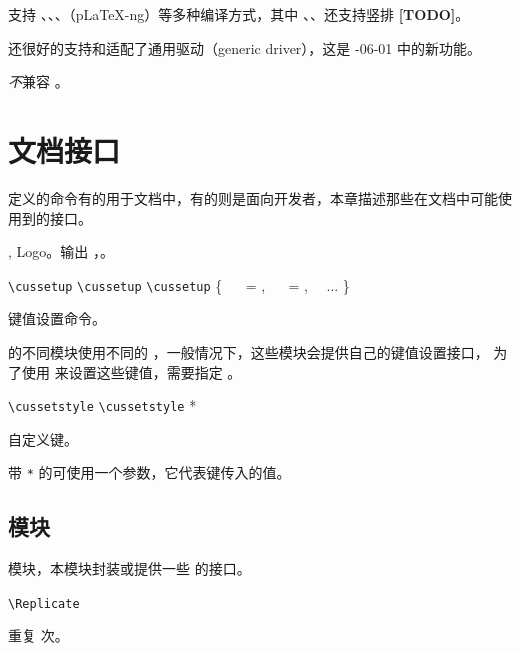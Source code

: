 \documentclass[twoside]{book}
\newcommand*{\TODO}{\textcolor{red!90!black}{\bfseries[TODO]}}
\begin{document}
\CusTeX 支持 \XeLaTeX、\LuaLaTeX、\upLaTeX、\ApLaTeX（p\LaTeX-ng）等多种编译方式，其中
\LuaLaTeX、\upLaTeX、\ApLaTeX 还支持竖排 \TODO。

\CusTeX 还很好的支持和适配了通用驱动（generic driver），这是 -06-01 中的新功能。

\emph{不}兼容 。

\chapter{文档接口}

\CusTeX 定义的命令有的用于文档中，有的则是面向开发者，本章描述那些在文档中可能使用到的接口。

\begin{function}{\CusTeX,\CusLaTeX}
Logo。输出 \CusTeX，\CusLaTeX。
\end{function}

\begin{function}{\cussetup}
\begin{syntax}
  \verb|\cussetup| 
  \verb|\cussetup|  
  \verb|\cussetup| \{
  ~~ =  ,
  ~~ =  ,
  ~~...
  \}
\end{syntax}
键值设置命令。

\CusTeX 的不同模块使用不同的 ，一般情况下，这些模块会提供自己的键值设置接口，
为了使用  来设置这些键值，需要指定 。
\end{function}

\begin{function}{\cussetstyle}
\begin{syntax}
  \verb|\cussetstyle|     
  \verb|\cussetstyle| *   
\end{syntax}
自定义键。

带 \verb|*| 的可使用一个参数，它代表键传入的值。
\end{function}

\section{模块}

 模块，本模块封装或提供一些 \LaTeXe 的接口。

\begin{function}[EXP]{\Replicate}
\begin{syntax}
  \verb|\Replicate|  
\end{syntax}
重复   次。
\end{function}
\end{document}
